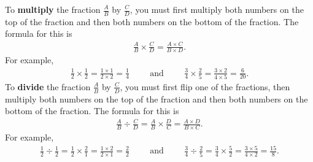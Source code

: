 \documentclass[12pt]{article}
\theoremstyle{definition}
\begin{document}
To \textbf{multiply} the fraction $\frac{A}{B}$ by $\frac{C}{D}$, you must first multiply both numbers on the top of the fraction and then both numbers on the bottom of the fraction. The formula for this is
\begin{align}
\frac{A}{B} \times \frac{C}{D} = \frac{A \times C}{B \times D}.
\end{align}
For example,
\begin{align}
\frac{1}{2} \times \frac{1}{2} = \frac{1 \times 1}{2 \times 2} = \frac{1}{4} \hspace{1cm}\textrm{and}\hspace{1cm}\frac{3}{4}\times \frac{2}{5} = \frac{3 \times 2}{4 \times 5} = \frac{6}{20}.
\end{align}
To \textbf{divide} the fraction $\frac{A}{B}$ by $\frac{C}{D}$, you must first flip one of the fractions, then multiply both numbers on the top of the fraction and then both numbers on the bottom of the fraction. The formula for this is
\begin{align}
	\frac{A}{B} \div \frac{C}{D} = \frac{A}{B} \times \frac{D}{C}= \frac{A \times D}{B \times C}.
\end{align}
For example,
\begin{align}
	\frac{1}{2} \div \frac{1}{2} = \frac{1}{2} \times \frac{2}{1} = \frac{1 \times 2}{2 \times 1} = \frac{2}{2} \hspace{1cm}\textrm{and}\hspace{1cm}\frac{3}{4}\div \frac{2}{5} =\frac{3}{4}\times \frac{5}{2}= \frac{3 \times 5}{4 \times 2} = \frac{15}{8}.
\end{align}
\newpage
\end{document}
